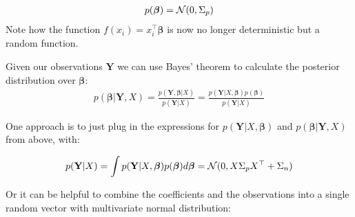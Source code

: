 \begin{gather*}
    p(\boldsymbol{\beta}) = \operatorname{\mathcal{N}}(0, \Sigma_p)
\end{gather*}
Note how the function $f(x_i)=x_i^{\top}\boldsymbol{\beta}$ is now no longer deterministic but a random function.

Given our observations $\mathbf{Y}$  we can use Bayes' theorem to calculate the posterior distribution over $\boldsymbol{\beta}$:
\begin{gather*}
    p(\boldsymbol{\beta}| \mathbf{Y}, X) = \frac{p(\mathbf{Y},\boldsymbol{\beta}|X)}{p(\mathbf{Y}|X)} =
    \frac{p(\mathbf{Y}|X,\boldsymbol{\beta})p(\boldsymbol{\beta})}{p(\mathbf{Y}|X)}
\end{gather*}

One approach is to just plug in the expressions for
$p(\mathbf{Y}|X,\boldsymbol{\beta})$ and $p(\boldsymbol{\beta}|\mathbf{Y}, X)$ from above, with:

\begin{gather*}
    p(\mathbf{Y}|X) = \int p(\mathbf{Y}|X,\boldsymbol{\beta}) p(\boldsymbol{\beta}) d\boldsymbol{\beta} = \operatorname{\mathcal{N}}(0, X \Sigma_p X^{\top} + \Sigma_n)
\end{gather*}

Or it can be helpful to combine the coefficients and the observations into a single random vector with
multivariate normal distribution:

